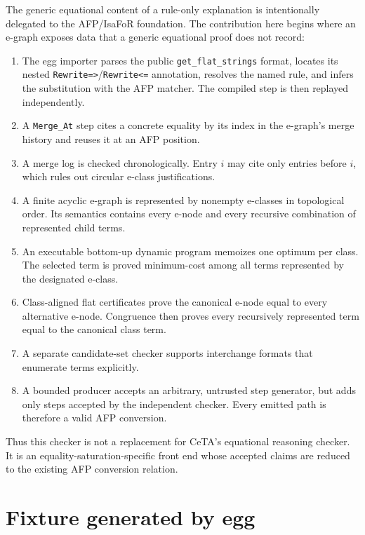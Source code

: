 \documentclass[11pt,a4paper]{article}
\begin{document}
The generic equational content of a rule-only explanation is intentionally
delegated to the AFP/IsaFoR foundation.  The contribution here begins where an
e-graph exposes data that a generic equational proof does not record:
\begin{enumerate}
  \item The egg importer parses the public \texttt{get\_flat\_strings} format,
        locates its nested \texttt{Rewrite=>}/\texttt{Rewrite<=} annotation,
        resolves the named rule, and infers the substitution with the AFP
        matcher.  The compiled step is then replayed independently.
  \item A \texttt{Merge\_At} step cites a concrete equality by its index in the
        e-graph's merge history and reuses it at an AFP position.
  \item A merge log is checked chronologically.  Entry $i$ may cite only entries
        before $i$, which rules out circular e-class justifications.
  \item A finite acyclic e-graph is represented by nonempty e-classes in
        topological order.  Its semantics contains every e-node and every
        recursive combination of represented child terms.
  \item An executable bottom-up dynamic program memoizes one optimum per class.
        The selected term is proved minimum-cost among all terms represented by
        the designated e-class.
  \item Class-aligned flat certificates prove the canonical e-node equal to
        every alternative e-node.  Congruence then proves every recursively
        represented term equal to the canonical class term.
  \item A separate candidate-set checker supports interchange formats that
        enumerate terms explicitly.
  \item A bounded producer accepts an arbitrary, untrusted step generator, but
        adds only steps accepted by the independent checker.  Every emitted
        path is therefore a valid AFP conversion.
\end{enumerate}

Thus this checker is not a replacement for CeTA's equational reasoning
checker.  It is an equality-saturation-specific front end whose accepted
claims are reduced to the existing AFP conversion relation.

\section{Fixture generated by egg}
\end{document}
